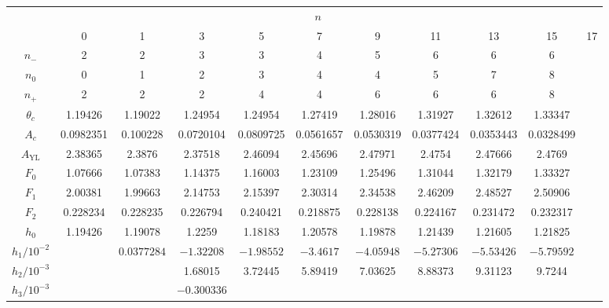 \documentclass[
  aps,
  pre,
  preprint,
  longbibliography,
  floatfix
]{revtex4-2}
\begin{document}
\begin{table}
  \begin{tabular}{c|cccccccccc}
     & \multicolumn{9}{c}{$n$} \\
     & 0 & 1 & 3 & 5 & 7 & 9 & 11 & 13 & 15 & 17 \\
    \hline\hline
    $n_-$ & 2 & 2 & 3 & 3 & 4 & 5 & 6 & 6 & 6 \\
    $n_0$ & 0 & 1 & 2 & 3 & 4 & 4 & 5 & 7 & 8 \\
    $n_+$ & 2 & 2 & 2 & 4 & 4 & 6 & 6 & 6 & 8
    \\ \hline
    $\theta_c$ &
      1.19426 &
      1.19022 &
      1.24954 &
      1.24954 &
      1.27419 &
      1.28016 &
      1.31927 & 
      1.32612 &
      1.33347 &
              \\
    $A_c$ &
      0.0982351 &
      0.100228 &
      0.0720104 &
      0.0809725 &
      0.0561657 &
      0.0530319 &
      0.0377424 &
      0.0353443 &
      0.0328499 &
                \\
    $A_{\mathrm{YL}}$ &
      2.38365 &
      2.3876 &
      2.37518 &
      2.46094 &
      2.45696 &
      2.47971 &
      2.4754 &
      2.47666 &
      2.4769 &
                \\
    $F_0$ &
      1.07666 &
      1.07383 &
      1.14375 &
      1.16003 &
      1.23109 &
      1.25496 &
      1.31044 &
      1.32179 &
      1.33327 &
                \\
    $F_1$ &
      2.00381 &
      1.99663 &
      2.14753 &
      2.15397 &
      2.30314 &
      2.34538 &
      2.46209 &
      2.48527 &
      2.50906 &
                \\
    $F_2$ &
      0.228234 &
      0.228235 &
      0.226794 &
      0.240421 &
      0.218875 &
      0.228138 &
      0.224167 &
      0.231472 &
      0.232317 &
                \\
    $h_0$ &
      1.19426 &
      1.19078 &
      1.2259 &
      1.18183 &
      1.20578 &
      1.19878 &
      1.21439 &
      1.21605 &
      1.21825 &
                \\
      $h_1/10^{-2}$ & &
      $0.0377284$ &
      $-1.32208$ &
      $-1.98552$ &
      $-3.4617$ &
      $-4.05948$ &
      $-5.27306$ &
      $-5.53426$ &
      $-5.79592$ &
                \\
    $h_2/10^{-3}$ & &
       &
      1.68015 &
      3.72445 &
      5.89419 &
      7.03625 &
      8.88373 &
      9.31123 &
      9.7244 &
                \\
    $h_3/10^{-3}$ & & &
      $-0.300336$ &

\end{tabular}
\end{table}
\end{document}
